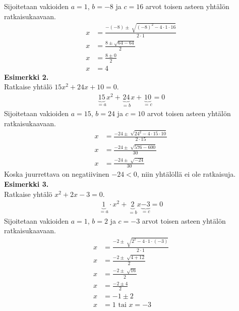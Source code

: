 Sijoitetaan vakioiden $a=1$, $b=-8$ ja $c=16$ arvot toisen asteen yhtälön ratkaisukaavaan.
\begin{align*}
x&=\frac{-(-8)\pm \sqrt[]{(-8)^2-4\cdot 1 \cdot 16}}{2 \cdot 1} \\
x&=\frac{8 \pm \sqrt{64- 64}}{2} \\
x&=\frac{8 \pm 0}{2} \\
x&=4
\end{align*}
\textbf{Esimerkki 2.} \\
Ratkaise yhtälö $15x^2+24x+10=0$.
\begin{align*}
\underbrace{15}_{=a}x^2+\underbrace{24}_{=b}x+\underbrace{10}_{=c}=0 
\end{align*}
Sijoitetaan vakioiden $a=15$, $b=24$ ja $c=10$ arvot toisen asteen yhtälön ratkaisukaavaan.
\begin{align*}
x&=\frac{-24 \pm \sqrt[]{24^2-4 \cdot 15 \cdot 10}}{2 \cdot 15} \\
x&=\frac{-24 \pm \sqrt[]{576-600}}{30} \\
x&=\frac{-24 \pm \sqrt[]{-24}}{30}
\end{align*}
Koska juurrettava on negatiivinen $-24<0$, niin yhtälöllä ei ole ratkaisuja. \\ 
\textbf{Esimerkki 3.} \\
Ratkaise yhtälö $x^2+2x-3=0$. 
\begin{align*}
\underbrace{1}_{=a} \cdot x^2+\underbrace{2}_{=b}x\underbrace{-3}_{=c}=0 
\end{align*}
Sijoitetaan vakioiden $a=1$, $b=2$ ja $c=-3$ arvot toisen asteen yhtälön ratkaisukaavaan.
\begin{align*}
x&=\frac{-2 \pm \sqrt[]{2^2-4 \cdot 1 \cdot (-3)}}{2 \cdot 1} \\
x&=\frac{-2 \pm \sqrt[]{4+12}}{2} \\
x&=\frac{-2 \pm \sqrt[]{16}}{2} \\
x&=\frac{-2 \pm 4}{2} \\
x&=-1 \pm 2 \\
x&=1 \text{ tai } x=-3 \\
\end{align*}


